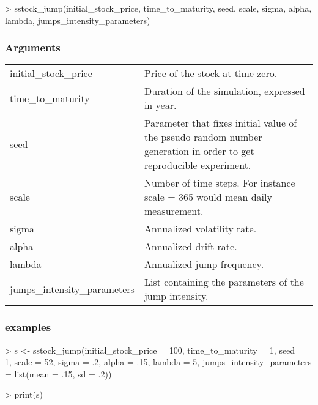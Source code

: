 \documentclass[12pt]{report}
\begin{document}
\begin{appendices}
\begin{Schunk}
\begin{Sinput}
> sstock_jump(initial_stock_price, time_to_maturity, 
        seed, scale, sigma, alpha, lambda, jumps_intensity_parameters)
\end{Sinput}
\end{Schunk}

\subsubsection*{Arguments}

\begin{tabularx}{\textwidth}{lX}
  initial\_stock\_price & Price of the stock at time zero.\\
  time\_to\_maturity & Duration of the simulation, expressed in year.\\
  seed & Parameter that fixes initial value of the pseudo random number generation in order to get reproducible experiment. \\
  scale & Number of time steps. For instance scale = 365 would mean daily measurement.\\
  sigma & Annualized volatility rate. \\
  alpha & Annualized drift rate.\\
  lambda & Annualized jump frequency. \\
  jumps\_intensity\_parameters & List containing the parameters of the jump intensity. 
\end{tabularx}

\subsubsection*{examples}
\label{sec:r:time:geometric:ex}

\begin{Schunk}
\begin{Sinput}
> s <- sstock_jump(initial_stock_price = 100,
                  time_to_maturity = 1,
                  seed = 1,
                  scale = 52,
                  sigma = .2,
                  alpha = .15,
                  lambda = 5,
                  jumps_intensity_parameters = list(mean = .15, sd = .2))
\end{Sinput}
\end{Schunk}


\begin{Schunk}
\begin{Sinput}
> print(s)
\end{Sinput}
\end{Schunk}


\end{appendices}
\end{document}
